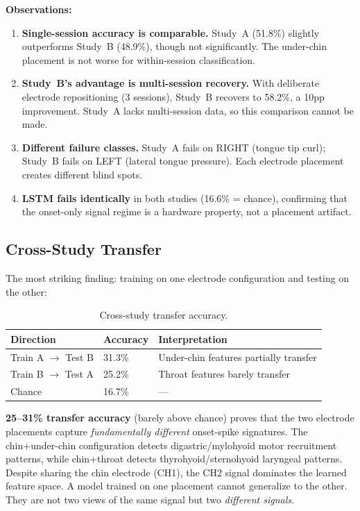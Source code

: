 \documentclass{article}
\begin{document}
\textbf{Observations:}
\begin{enumerate}
    \item \textbf{Single-session accuracy is comparable.} Study~A (51.8\%) slightly outperforms Study~B (48.9\%), though not significantly. The under-chin placement is not worse for within-session classification.
    \item \textbf{Study~B's advantage is multi-session recovery.} With deliberate electrode repositioning (3 sessions), Study~B recovers to 58.2\%, a 10pp improvement. Study~A lacks multi-session data, so this comparison cannot be made.
    \item \textbf{Different failure classes.} Study~A fails on RIGHT (tongue tip curl); Study~B fails on LEFT (lateral tongue pressure). Each electrode placement creates different blind spots.
    \item \textbf{LSTM fails identically} in both studies (16.6\% = chance), confirming that the onset-only signal regime is a hardware property, not a placement artifact.
\end{enumerate}

\subsection{Cross-Study Transfer}

The most striking finding: training on one electrode configuration and testing on the other:

\begin{table}[ht]
\centering
\caption{Cross-study transfer accuracy.}
\label{tab:crossstudy}
\begin{tabular}{@{}lll@{}}
\toprule
Direction & Accuracy & Interpretation \\
\midrule
Train A $\to$ Test B & 31.3\% & Under-chin features partially transfer \\
Train B $\to$ Test A & 25.2\% & Throat features barely transfer \\
\midrule
Chance & 16.7\% & --- \\
\bottomrule
\end{tabular}
\end{table}

\textbf{25--31\% transfer accuracy} (barely above chance) proves that the two electrode placements capture \emph{fundamentally different} onset-spike signatures. The chin+under-chin configuration detects digastric/mylohyoid motor recruitment patterns, while chin+throat detects thyrohyoid/sternohyoid laryngeal patterns. Despite sharing the chin electrode (CH1), the CH2 signal dominates the learned feature space. A model trained on one placement cannot generalize to the other. They are not two views of the same signal but two \emph{different signals}.
\end{document}

